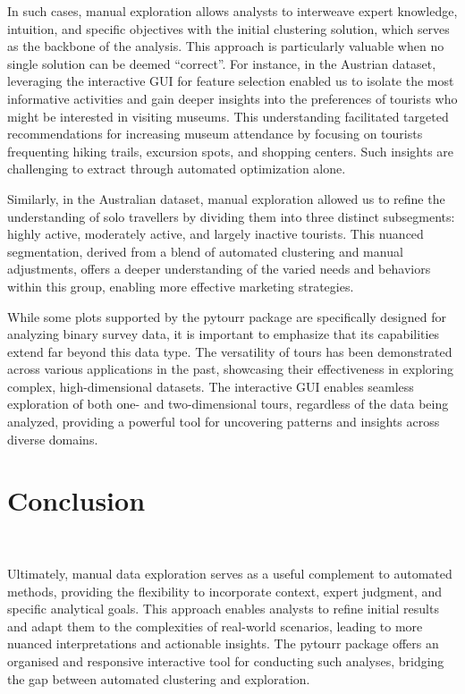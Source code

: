 \documentclass[article]{ajs}
\begin{document}
In such cases, manual exploration allows analysts to interweave expert knowledge, intuition, and specific objectives with the initial clustering solution, which serves as the backbone of the analysis. This approach is particularly valuable when no single solution can be deemed “correct''. For instance, in the Austrian dataset, leveraging the interactive GUI for feature selection enabled us to isolate the most informative activities and gain deeper insights into the preferences of tourists who might be interested in visiting museums. This understanding facilitated targeted recommendations for increasing museum attendance by focusing on tourists frequenting hiking trails, excursion spots, and shopping centers. Such insights are challenging to extract through automated optimization alone.

Similarly, in the Australian dataset, manual exploration allowed us to refine the understanding of solo travellers by dividing them into three distinct subsegments: highly active, moderately active, and largely inactive tourists. This nuanced segmentation, derived from a blend of automated clustering and manual adjustments, offers a deeper understanding of the varied needs and behaviors within this group, enabling more effective marketing strategies.

While some plots supported by the pytourr package are specifically designed for analyzing binary survey data, it is important to emphasize that its capabilities extend far beyond this data type. The versatility of tours has been demonstrated across various applications in the past, showcasing their effectiveness in exploring complex, high-dimensional datasets. The interactive GUI enables seamless exploration of both one- and two-dimensional tours, regardless of the data being analyzed, providing a powerful tool for uncovering patterns and insights across diverse domains.


\section{Conclusion}~\label{conclusion}

Ultimately, manual data exploration serves as a useful complement to automated methods, providing the flexibility to incorporate context, expert judgment, and specific analytical goals. This approach enables analysts to refine initial results and adapt them to the complexities of real-world scenarios, leading to more nuanced interpretations and actionable insights. The pytourr package offers an organised and responsive interactive tool for conducting such analyses, bridging the gap between automated clustering and exploration.
\end{document}
